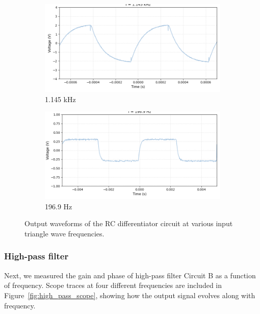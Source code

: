 \documentclass{article}
\begin{document}
\begin{figure}[H]
    \vspace{0.5em}
    
    \begin{subfigure}[b]{0.32\textwidth}
        \includegraphics[width=\textwidth]{2.2.be.png}
        \caption{1.145 kHz}
    \end{subfigure}
    \begin{subfigure}[b]{0.32\textwidth}
        \includegraphics[width=\textwidth]{2.2.bf.png}
        \caption{196.9 Hz}
    \end{subfigure}
    
    \caption{Output waveforms of the RC differentiator circuit at various input triangle wave frequencies.}
    \label{fig:diff}
\end{figure}



\subsubsection{High-pass filter}

Next, we measured the gain and phase of high-pass filter Circuit B 
as a function of frequency. Scope traces at four different frequencies are
included in Figure~\ref{fig:high_pass_scope}, showing how the output
signal evolves along with frequency.
\end{document}
